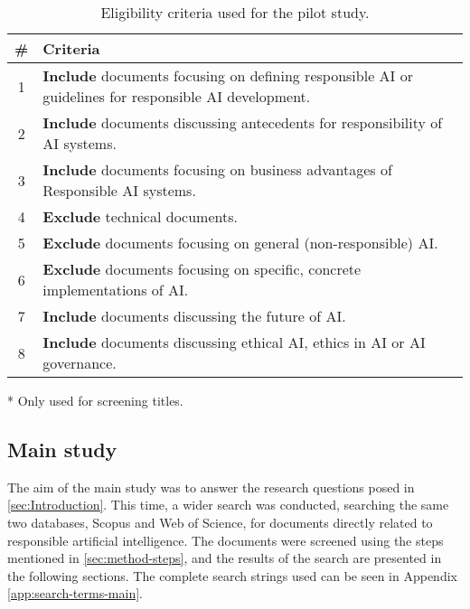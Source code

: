 \begin{table}[htp]
    \centering
    \caption{Eligibility criteria used for the pilot study.}
    \label{tab:criteria-pilot}
    \begin{threeparttable}
    \begin{tabular}{cp{}}
    \toprule
        \textbf{\#} & \textbf{Criteria} \\
    \midrule
        1 & \textbf{Include} documents focusing on defining responsible AI or guidelines for responsible AI development. \\
        2 & \textbf{Include} documents discussing antecedents for responsibility of AI systems. \\
        3 & \textbf{Include} documents focusing on business advantages of Responsible AI systems. \\
        \midrule
        4 & \textbf{Exclude} technical documents. \\
        5 & \textbf{Exclude} documents focusing on general (non-responsible) AI. \\
        6 & \textbf{Exclude} documents focusing on specific, concrete implementations of AI. \\
        \midrule
        7\tnote{*} & \textbf{Include} documents discussing the future of AI. \\
        8\tnote{*} & \textbf{Include} documents discussing ethical AI, ethics in AI or AI governance. \\
    \bottomrule
    \end{tabular}
    \begin{tablenotes}
        \footnotesize
        \item [*] Only used for screening titles.
    \end{tablenotes}
\end{threeparttable}
\end{table}


\subsection{Main study}
The aim of the main study was to answer the research questions posed in \autoref{sec:Introduction}. This time, a wider search was conducted, searching the same two databases, Scopus and Web of Science, for documents directly related to responsible artificial intelligence. The documents were screened using the steps mentioned in \autoref{sec:method-steps}, and the results of the search are presented in the following sections. The complete search strings used can be seen in Appendix \ref{app:search-terms-main}.


